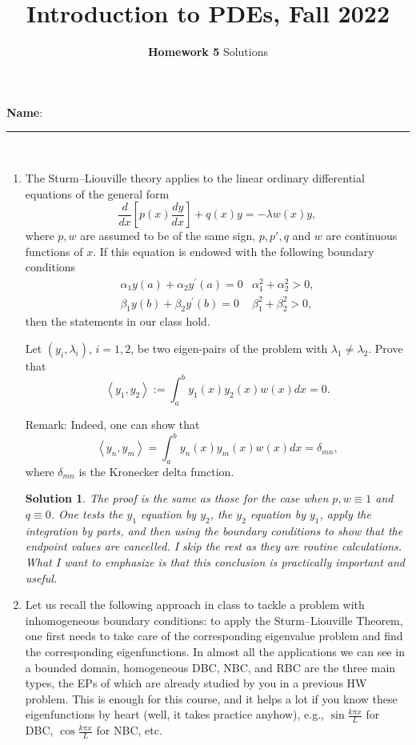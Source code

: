 \documentclass[6pt]{article}
\title{Introduction to PDEs, Fall 2022}
\author{\textbf{Homework 5} Solutions}
\date{}
\newtheorem{solution}{Solution}
\numberwithin{equation}{section}
\begin{document}
\maketitle

\textbf{Name}:\rule{1 in}{0.001 in} \\
\begin{enumerate}

\item The Sturm--Liouville theory applies to the linear ordinary differential equations of the general form
\[\frac{d}{d x}\left[p(x) \frac{d y}{d x}\right]+q(x) y=-\lambda w(x) y,\]
where $p,w$ are assumed to be of the same sign, $p,p',q$ and $w$ are continuous functions of $x$.  If this equation is endowed with the following boundary conditions
\[
\begin{array}{ll}
\alpha_1 y(a)+\alpha_2 y^{\prime}(a)=0 & \alpha_1^2+\alpha_2^2>0, \\
\beta_1 y(b)+\beta_2 y^{\prime}(b)=0 & \beta_1^2+\beta_2^2>0,
\end{array}
\]
then the statements in our class hold.

Let $(y_i,\lambda_i)$, $i=1,2$, be two eigen-pairs of the problem with $\lambda_1\neq\lambda_2$.  Prove that
\[\left\langle y_1, y_2\right\rangle:=\int_a^b y_1(x) y_2(x) w(x) d x=0.\]

Remark:  Indeed, one can show that
\[\left\langle y_n, y_m\right\rangle=\int_a^b y_n(x) y_m(x) w(x) d x=\delta_{m n},\]
where $\delta_{m n}$ is the Kronecker delta function.

\begin{solution}
The proof is the same as those for the case when $p,w\equiv 1$ and $q\equiv 0$.  One tests the $y_1$ equation by $y_2$, the $y_2$ equation by $y_1$, apply the integration by parts, and then using the boundary conditions to show that the endpoint values are cancelled.  I skip the rest as they are routine calculations.  What I want to emphasize is that this conclusion is practically important and useful.
\end{solution}


\item Let us recall the following approach in class to tackle a problem with inhomogeneous boundary conditions: to apply the Sturm--Liouville Theorem, one first needs to take care of the corresponding eigenvalue problem and find the corresponding eigenfunctions.  In almost all the applications we can see in a bounded domain, homogeneous DBC, NBC, and RBC are the three main types, the EPs of which are already studied by you in a previous HW problem.  This is enough for this course, and it helps a lot if you know these eigenfunctions by heart (well, it takes practice anyhow), e.g., $\sin\frac{k\pi x}{L}$ for DBC, $\cos\frac{k\pi x}{L}$ for NBC, etc.


\end{enumerate}
\end{document}
